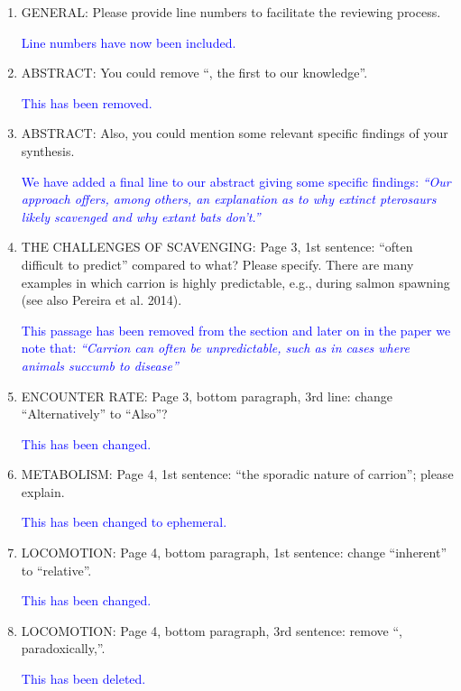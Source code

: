 \documentclass[12pt,letterpaper]{article}
\begin{document}
\begin{enumerate}

\item{GENERAL:} Please provide line numbers to facilitate the reviewing process.

\textcolor{blue}{Line numbers have now been included. }

\item{ABSTRACT:} You could remove ``, the first to our knowledge''.

\textcolor{blue}{This has been removed.}

\item{ABSTRACT:} Also, you could mention some relevant specific findings of your synthesis.

\textcolor{blue}{We have added a final line to our abstract giving some specific findings: \textit{``Our approach offers, among others, an explanation as to why extinct pterosaurs likely scavenged and why extant bats don't.''}} 


\item{THE CHALLENGES OF SCAVENGING:} Page 3, 1st sentence: ``often difficult to predict'' compared to what? Please specify. There are many examples in which carrion is highly predictable, e.g., during salmon spawning (see also Pereira et al. 2014).

\textcolor{blue}{This passage has been removed from the section and later on in the paper we note that: \textit{``Carrion can often be unpredictable, such as in cases where animals succumb to disease''}}

\item{ENCOUNTER RATE:} Page 3, bottom paragraph, 3rd line: change ``Alternatively'' to ``Also''?

\textcolor{blue}{This has been changed.}

\item{METABOLISM:} Page 4, 1st sentence: ``the sporadic nature of carrion''; please explain.

\textcolor{blue}{This has been changed to ephemeral.}

\item{LOCOMOTION:} Page 4, bottom paragraph, 1st sentence: change ``inherent'' to ``relative''.

\textcolor{blue}{This has been changed.}

\item{LOCOMOTION:} Page 4, bottom paragraph, 3rd sentence: remove ``, paradoxically,''.

\textcolor{blue}{This has been deleted.}


\end{enumerate}
\end{document}
